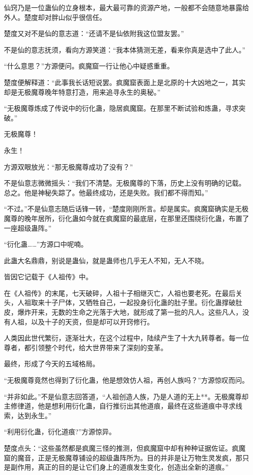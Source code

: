 \begin{this_body}
仙窍乃是一位蛊仙的立身根本，最大最可靠的资源产地，一般都不会随意地暴露给外人。楚度却对胖山似乎很信任。

楚度又对不是仙的意志道：“还请不是仙依附我这位盟友罢。”

不是仙的意志抚须，看向方源笑道：“我本体猜测无差，看来你真是选中了此人。”

“什么意思？”方源便问。疯魔窟一行让他心中疑惑重重。

楚度便解释道：“此事我长话短说罢。疯魔窟表面上是北原的十大凶地之一，其实却是无极魔尊晚年特意打造，用来追寻永生的奥秘。”

“无极魔尊炼成了传说中的衍化蛊，隐居疯魔窟。在那里不断试验和炼蛊，寻求突破。”

无极魔尊！

永生！

方源双眼放光：“那无极魔尊成功了没有？”

不是仙意志微微摇头：“我们不清楚。无极魔尊的下落，历史上没有明确的记载。总之。他是神秘失踪了。他最终成功，还是失败。我们都不得而知。”

“不过。”不是仙意志随后话锋一转，“楚度刚刚所言。却是属实。疯魔窟确实是无极魔尊的晚年居所，衍化蛊如今就在疯魔窟的最底层，在那里还围绕衍化蛊，布置了一座超级蛊阵。”

“衍化蛊……”方源口中呢喃。

此蛊大名鼎鼎，别说是蛊仙，就是蛊师也几乎无人不知，无人不晓。

皆因它记载于《人祖传》中。

在《人祖传》的末尾，七天破碎，人祖十子相继灭亡，人祖也要老死。在最后关头，人祖取来十子尸体，又牺牲自己，一起投身衍化蛊的肚子里。衍化蛊撑破肚皮，爆炸开来，无数的生命之光落于大地，就形成了第一批的凡人。这些凡人，没有人祖，以及十子的天资，但是却可以开窍修行。

人类因此世代繁衍，逐渐壮大，在这个过程中，陆续产生了十大九转尊者。每一位尊者，都引领整个时代，给大世界带来了深刻的变革。

最终，形成了今天的五域格局。

“无极魔尊竟然也得到了衍化蛊，他是想效仿人祖，再创人族吗？”方源惊叹而问。

“并非如此。”不是仙意志回答道，“人祖创造人族，乃是人道的无上**。无极魔尊却主修律道，他是想利用衍化蛊，自行推衍出其他道痕，最终在这些道痕中寻求线索，达到永生。”

“利用衍化蛊，衍化道痕?”方源惊异。

楚度点头：“这些虽然都是疯魔三怪的推测，但疯魔窟中却有种种证据佐证。疯魔窟的魔音，正是无极魔尊铺设的超级蛊阵所为。目的并非是让万物生灵发疯，那只是副作用，真正的目的是让它们身上的道痕发生变化，创造出全新的道痕。”


\end{this_body}
